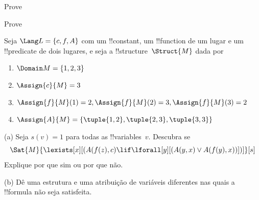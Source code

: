 \documentclass[../../../include/open-logic-section]{subfiles}
\begin{document}

\begin{prob}
  Prove 
\end{prob}
\tagendprob


\begin{prob}
  Prove 
\end{prob}
\tagendprob

\begin{prob}
Seja $\Lang L = \{c, f, A\}$ com um !!{constant}, um !!{function}
de um lugar e um !!{predicate} de dois lugares, e seja a
!!{structure}~$\Struct{M}$ dada por
\begin{enumerate}
\item $\Domain M = \{1, 2, 3\}$
\item $\Assign{c}{M} = 3$
\item $\Assign{f}{M}(1) = 2, \Assign{f}{M}(2) = 3, \Assign{f}{M}(3) = 2$
\item $\Assign{A}{M} = \{\tuple{1, 2}, \tuple{2, 3}, \tuple{3, 3}\}$
\end{enumerate}
(a) Seja $s(v) = 1$ para todas as !!{variable}s~$v$.  Descubra se
\[
\Sat{M}{\lexists[x][(A(f(z), c) \lif \lforall[y][(A(y, x) \lor A(f(y),
      x))])]}[s]
\]
Explique por que sim ou por que não.

(b) Dê uma estrutura e uma atribuição de variáveis diferentes nas quais a
!!{formula} não seja satisfeita.
\end{prob}
\end{document}
